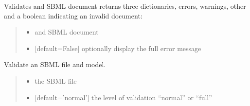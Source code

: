 \documentclass[letterpaper,12pt,english]{sphinxmanual}
\begin{document}
\begin{fulllineitems}
\label{\detokenize{api/io:cbmpy.CBXML.sbml_validateDocument}}
\pysigstartsignatures
\pysiglinewithargsret
{}
{\sphinxparamcomma {}\sphinxparamcomma {}}
{}
\pysigstopsignatures
\sphinxAtStartPar
Validates and SBML document returns three dictionaries, errors, warnings, other and a boolean indicating an invalid document:
\begin{quote}\begin{description}
\begin{itemize}
\item {} 
\sphinxAtStartPar
{} \textendash{} and SBML document

\item {} 
\sphinxAtStartPar
{} \textendash{} {[}default=False{]} optionally display the full error message

\end{itemize}

\end{description}\end{quote}

\end{fulllineitems}


\begin{fulllineitems}
\label{\detokenize{api/io:cbmpy.CBXML.sbml_fileValidate}}
\pysigstartsignatures
\pysiglinewithargsret
{}
{\sphinxparamcomma {}}
{}
\pysigstopsignatures
\sphinxAtStartPar
Validate an SBML file and model.
\begin{quote}\begin{description}
\begin{itemize}
\item {} 
\sphinxAtStartPar
{} \textendash{} the SBML file

\item {} 
\sphinxAtStartPar
{} \textendash{} {[}default=’normal’{]} the level of validation “normal” or “full”

\end{itemize}

\end{description}\end{quote}

\end{fulllineitems}
\end{document}
